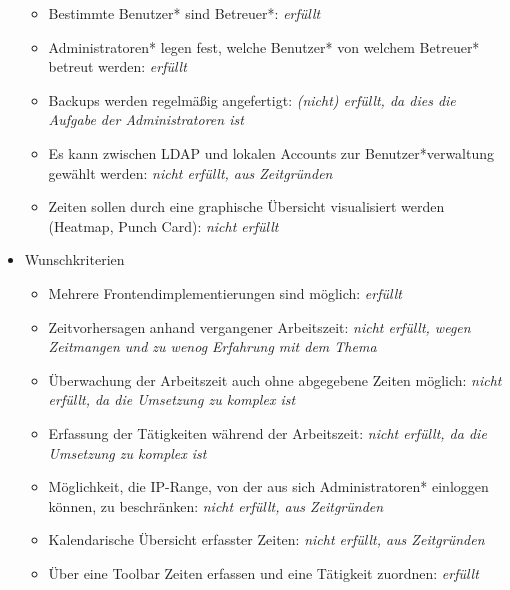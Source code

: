 \begin{itemize}
\begin{itemize}
    	\item Bestimmte Benutzer* sind Betreuer*: \emph{erfüllt}
    	\item Administratoren* legen fest, welche Benutzer* von welchem Betreuer* betreut werden: \emph{erfüllt}
    	\item Backups werden regelmäßig angefertigt: \emph{(nicht) erfüllt, da dies die Aufgabe der Administratoren ist}
    	\item Es kann zwischen LDAP und lokalen Accounts zur Benutzer*verwaltung gewählt werden: \emph{nicht erfüllt, aus Zeitgründen}
    	\item Zeiten sollen durch eine graphische Übersicht visualisiert werden (Heatmap, Punch Card): \emph{nicht erfüllt}
  \end{itemize}
    
    
  \newpage
  \item Wunschkriterien
    \begin{itemize}
	    \item Mehrere Frontendimplementierungen sind möglich: \emph{erfüllt}
    	\item Zeitvorhersagen anhand vergangener Arbeitszeit: \emph{nicht erfüllt, wegen Zeitmangen und zu wenog Erfahrung mit dem Thema}
    	\item Überwachung der Arbeitszeit auch ohne abgegebene Zeiten möglich: \emph{nicht erfüllt, da die Umsetzung zu komplex ist} 
    	\item Erfassung der Tätigkeiten während der Arbeitszeit: \emph{nicht erfüllt, da die Umsetzung zu komplex ist}
    	\item Möglichkeit, die IP-Range, von der aus sich Administratoren* einloggen können, zu beschränken: \emph{nicht erfüllt, aus Zeitgründen}
    	\item Kalendarische Übersicht erfasster Zeiten: \emph{nicht erfüllt, aus Zeitgründen}
    	\item Über eine Toolbar Zeiten erfassen und eine Tätigkeit zuordnen: \emph{erfüllt}
  \end{itemize}
\end{itemize}



      
